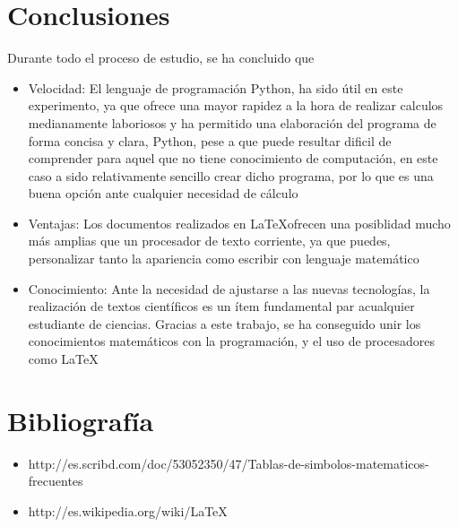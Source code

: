 \documentclass[14pt]{report}
\begin{document}
\pagebreak

\chapter{Conclusiones}
Durante todo el proceso de estudio, se ha concluido que
\begin{itemize}
          
  \item Velocidad: El lenguaje de programación Python, ha sido útil en este experimento, ya que ofrece una mayor rapidez a la hora de realizar calculos medianamente laboriosos y ha permitido una elaboración del programa de forma concisa y clara,
         Python, pese a que puede resultar dificil de comprender para aquel que no tiene conocimiento de computación, en este caso a sido relativamente sencillo crear dicho programa, por lo que es una buena opción ante cualquier necesidad de cálculo
  \item Ventajas: Los documentos realizados en \LaTeX ofrecen una posiblidad mucho más amplias que un procesador de texto corriente, ya que puedes,
         personalizar tanto la apariencia como escribir con lenguaje matemático
  \item Conocimiento: Ante la necesidad de ajustarse a las nuevas tecnologías, la realización de textos científicos es un ítem fundamental par acualquier estudiante de ciencias. Gracias a este trabajo, se ha conseguido unir los conocimientos 
         matemáticos con la programación, y el uso de procesadores como \LaTeX
          

\end{itemize}
\pagebreak
\chapter{Bibliografía}

\begin{itemize}
 \item http://es.scribd.com/doc/53052350/47/Tablas-de-simbolos-matematicos-frecuentes
 \item http://es.wikipedia.org/wiki/LaTeX
\end{itemize}


\pagebreak
\end{document}
